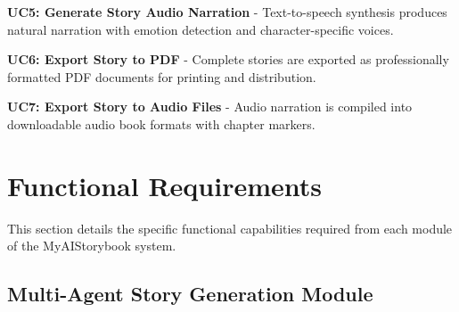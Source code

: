 \textbf{UC5: Generate Story Audio Narration} - Text-to-speech synthesis produces natural narration with emotion detection and character-specific voices.

\textbf{UC6: Export Story to PDF} - Complete stories are exported as professionally formatted PDF documents for printing and distribution.

\textbf{UC7: Export Story to Audio Files} - Audio narration is compiled into downloadable audio book formats with chapter markers.

\section{Functional Requirements}

This section details the specific functional capabilities required from each module of the MyAIStorybook system.

\subsection{Multi-Agent Story Generation Module}

